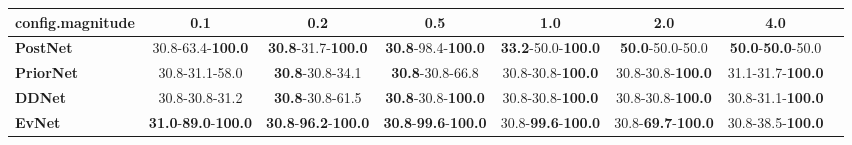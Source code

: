 \begin{tabular}{lccccccc}
\toprule
\textbf{config.magnitude} &                                         0.1 &                                         0.2 &                                         0.5 &                                1.0 &                                2.0 &                               4.0 \\
\midrule
\textbf{PostNet } &                    30.8-63.4-\textbf{100.0} &           \textbf{30.8}-31.7-\textbf{100.0} &           \textbf{30.8}-98.4-\textbf{100.0} &  \textbf{33.2}-50.0-\textbf{100.0} &            \textbf{50.0}-50.0-50.0 &  \textbf{50.0}-\textbf{50.0}-50.0 \\
\textbf{PriorNet} &                              30.8-31.1-58.0 &                     \textbf{30.8}-30.8-34.1 &                     \textbf{30.8}-30.8-66.8 &           30.8-30.8-\textbf{100.0} &           30.8-30.8-\textbf{100.0} &          31.1-31.7-\textbf{100.0} \\
\textbf{DDNet   } &                              30.8-30.8-31.2 &                     \textbf{30.8}-30.8-61.5 &           \textbf{30.8}-30.8-\textbf{100.0} &           30.8-30.8-\textbf{100.0} &           30.8-30.8-\textbf{100.0} &          30.8-31.1-\textbf{100.0} \\
\textbf{EvNet   } &  \textbf{31.0}-\textbf{89.0}-\textbf{100.0} &  \textbf{30.8}-\textbf{96.2}-\textbf{100.0} &  \textbf{30.8}-\textbf{99.6}-\textbf{100.0} &  30.8-\textbf{99.6}-\textbf{100.0} &  30.8-\textbf{69.7}-\textbf{100.0} &          30.8-38.5-\textbf{100.0} \\
\bottomrule
\end{tabular}
